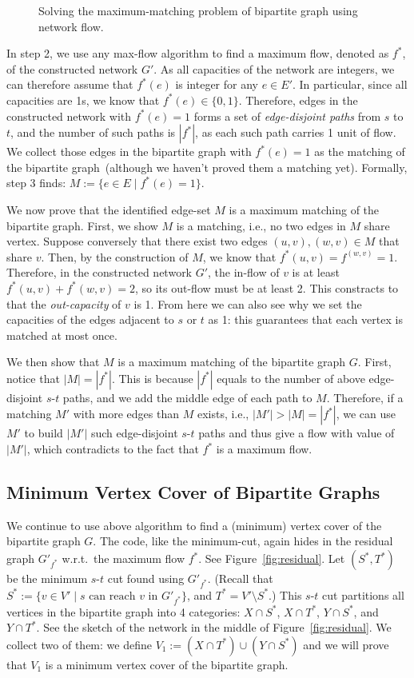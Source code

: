 \documentclass[letterpaper,11pt]{article}
\theoremstyle{mytheorem}
\begin{document}
\begin{figure}[h]
\centering{}
\caption{Solving the maximum-matching problem of bipartite graph using network flow.}
\label{fig:transform}
\end{figure}

In step 2, we use any max-flow algorithm to find a maximum flow, denoted as $f^*$,
of the constructed network $G'$. As all capacities of the network are integers,
we can therefore assume that $f^*(e)$ is integer for any $e\in E'$.
In particular, since all capacities are 1s, we know that $f^*(e) \in \{0, 1\}$.
Therefore, edges in the constructed network with $f^*(e) = 1$ forms a set of \emph{edge-disjoint paths}
from $s$ to $t$, and the number of such paths is $|f^*|$, as each such path
carries 1 unit of flow. We collect those edges in the bipartite graph with $f^*(e) = 1$
as the matching of the bipartite graph~(although we haven't proved them a matching yet).
Formally, step 3 finds: $M := \{e\in E\mid f^*(e) = 1\}$.


We now prove that the identified edge-set $M$ is a maximum matching of the bipartite graph.
First, we show $M$ is a matching, i.e., no two edges in $M$
share vertex. Suppose conversely that there exist two edges $(u,v), (w,v)\in M$ that share $v$.
Then, by the construction of $M$, we know that $f^*(u,v) = f^(w,v) = 1$.
Therefore, in the constructed network $G'$, the in-flow of $v$ is at least $f^*(u,v) + f^*(w,v) = 2$,
so its out-flow must be at least 2. This constracts to that the \emph{out-capacity} of $v$
is 1. From here we can also see why we set the capacities of the edges adjacent to $s$ or $t$
as 1: this guarantees that each vertex is matched at most once.

We then show that $M$ is a maximum matching of the bipartite graph $G$.
First, notice that $|M| = |f^*|$. This is because $|f^*|$ equals to the
number of above edge-disjoint $s$-$t$ paths, and we add the middle
edge of each path to $M$.  Therefore, if a matching $M'$ with more edges than $M$ exists, i.e., $|M'| > |M| = |f^*|$,
we can use $M'$ to build $|M'|$ such edge-disjoint $s$-$t$ paths and thus 
give a flow with value of $|M'|$, which contradicts to the fact that $f^*$ is a maximum flow.

\subsection*{Minimum Vertex Cover of Bipartite Graphs}

We continue to use above algorithm to find a (minimum) vertex cover of the bipartite graph $G$.
The code, like the minimum-cut, again hides in the residual graph $G'_{f^*}$ w.r.t.\ the maximum flow $f^*$.
See Figure~\ref{fig:residual}. Let $(S^*, T^*)$ be the minimum $s$-$t$ cut found using $G'_{f^*}$.
(Recall that $S^* := \{v\in V'\mid s \textrm{ can reach $v$ in } G'_{f^*} \}$, and $T^* = V'\setminus S^*$.)
This $s$-$t$ cut partitions all vertices in the bipartite graph into 4 categories:
$X\cap S^*$, $X\cap T^*$, $Y\cap S^*$, and $Y\cap T^*$.
See the sketch of the network in the middle of Figure~\ref{fig:residual}.
We collect two of them: we define $V_1 := (X\cap T^*)\cup (Y\cap S^*)$ 
and we will prove that $V_1$ is a minimum vertex cover of the bipartite graph.
\end{document}
